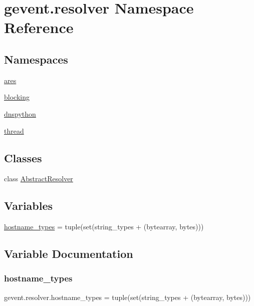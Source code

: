 \hypertarget{namespacegevent_1_1resolver}{}\section{gevent.\+resolver Namespace Reference}
\label{namespacegevent_1_1resolver}
\subsection*{Namespaces}
\begin{DoxyCompactItemize}
\item 
 \hyperlink{namespacegevent_1_1resolver_1_1ares}{ares}
\item 
 \hyperlink{namespacegevent_1_1resolver_1_1blocking}{blocking}
\item 
 \hyperlink{namespacegevent_1_1resolver_1_1dnspython}{dnspython}
\item 
 \hyperlink{namespacegevent_1_1resolver_1_1thread}{thread}
\end{DoxyCompactItemize}
\subsection*{Classes}
\begin{DoxyCompactItemize}
\item 
class \hyperlink{classgevent_1_1resolver_1_1_abstract_resolver}{Abstract\+Resolver}
\end{DoxyCompactItemize}
\subsection*{Variables}
\begin{DoxyCompactItemize}
\item 
\hyperlink{namespacegevent_1_1resolver_a8f8eaa60377061dba191c5793e9b183b}{hostname\+\_\+types} = tuple(set(string\+\_\+types + (bytearray, bytes)))
\end{DoxyCompactItemize}


\subsection{Variable Documentation}
\mbox{\label{namespacegevent_1_1resolver_a8f8eaa60377061dba191c5793e9b183b}} 
\subsubsection{\texorpdfstring{hostname\+\_\+types}{hostname\_types}}
{\footnotesize\ttfamily gevent.\+resolver.\+hostname\+\_\+types = tuple(set(string\+\_\+types + (bytearray, bytes)))}

